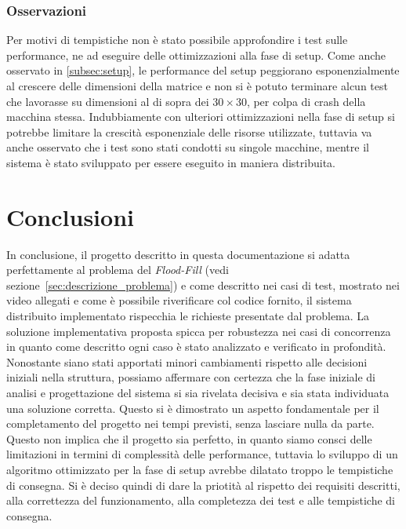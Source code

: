 \documentclass[12pt, a4paper]{report}
\begin{document}
\subsection{Osservazioni}

Per motivi di tempistiche non \`e stato possibile approfondire i test sulle performance, ne ad eseguire delle ottimizzazioni alla fase di setup. Come anche osservato in \ref{subsec:setup}, le performance del setup peggiorano esponenzialmente al crescere delle dimensioni della matrice e non si \`e potuto terminare alcun test che lavorasse su dimensioni al di sopra dei $30 \times 30$, per colpa di crash della macchina stessa. Indubbiamente con ulteriori ottimizzazioni nella fase di setup si potrebbe limitare la crescit\`a esponenziale delle risorse utilizzate, tuttavia va anche osservato che i test sono stati condotti su singole macchine, mentre il sistema \`e stato sviluppato per essere eseguito in maniera distribuita.

\chapter{Conclusioni}

In conclusione, il progetto descritto in questa documentazione si adatta perfettamente al problema del \textit{Flood-Fill} (vedi sezione~\ref{sec:descrizione_problema}) e come descritto nei casi di test, mostrato nei video allegati e come \`e possibile riverificare col codice fornito, il sistema distribuito implementato rispecchia le richieste presentate dal problema.
La soluzione implementativa proposta spicca per robustezza nei casi di concorrenza in quanto come descritto ogni caso \`e stato analizzato e verificato in profondit\`a.
Nonostante siano stati apportati minori cambiamenti rispetto alle decisioni iniziali nella struttura, possiamo affermare con certezza che la fase iniziale di analisi e progettazione del sistema si sia rivelata decisiva e sia stata individuata una soluzione corretta. Questo si \`e dimostrato un aspetto fondamentale per il completamento del progetto nei tempi previsti, senza lasciare nulla da parte.
Questo non implica che il progetto sia perfetto, in quanto siamo consci delle limitazioni in termini di complessit\`a delle performance, tuttavia lo sviluppo di un algoritmo ottimizzato per la fase di setup avrebbe dilatato troppo le tempistiche di consegna. Si \`e deciso quindi di dare la priotit\`a al rispetto dei requisiti descritti, alla correttezza del funzionamento, alla completezza dei test e alle tempistiche di consegna.
\end{document}
